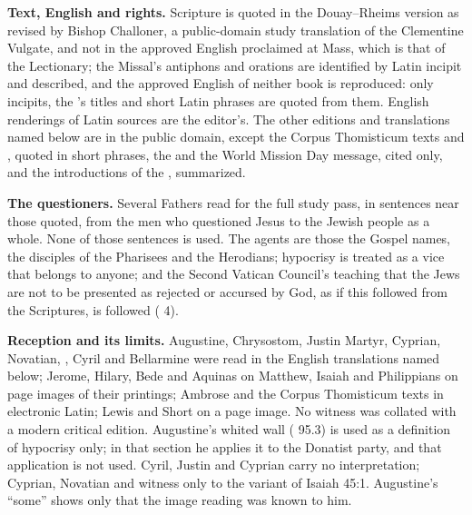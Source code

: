 {\textbf{Text, English and rights.} Scripture is quoted in the Douay--Rheims
version as revised by Bishop Challoner, a public-domain study translation of
the Clementine Vulgate, and not in the approved English proclaimed at Mass,
which is that of the Lectionary; the Missal's antiphons and orations are
identified by Latin incipit and described, and the approved English of neither
book is reproduced: only incipits, the 's titles and short Latin
phrases are quoted from them. English renderings of Latin sources are the editor's. The
other editions and translations named below are in the public domain, except
the Corpus Thomisticum texts and , quoted in short
phrases, the  and the World Mission Day message,
cited only, and the introductions of the , summarized.

\textbf{The questioners.} Several Fathers read for the full study pass, in
sentences near those quoted, from the men who questioned Jesus to the Jewish
people as a whole. None of those sentences is used. The agents are those the
Gospel names, the disciples of the Pharisees and the Herodians; hypocrisy is
treated as a vice that belongs to anyone; and the Second Vatican Council's
teaching that the Jews are not to be presented as rejected or accursed by God,
as if this followed from the Scriptures, is followed ( 4).

\textbf{Reception and its limits.} Augustine, Chrysostom, Justin Martyr,
Cyprian, Novatian, , Cyril and Bellarmine were read in the
English translations named below; Jerome, Hilary, Bede and Aquinas on Matthew,
Isaiah and Philippians on page images of their printings; Ambrose and the
Corpus Thomisticum texts in electronic Latin; Lewis and Short on a page image.
No witness was collated with a modern critical edition. Augustine's whited wall
( 95.3) is used as a definition of hypocrisy
only; in that section he applies it to the Donatist party, and that
application is not used. Cyril,
Justin and Cyprian carry no interpretation; Cyprian, Novatian and
 witness only to the variant of Isaiah 45:1. Augustine's
``some'' shows only that the image reading was known to him.

}
